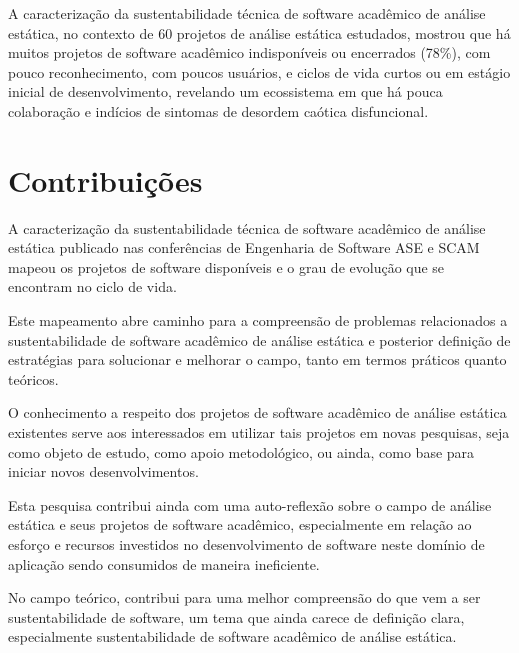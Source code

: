 A caracterização da sustentabilidade técnica de 
software acadêmico de análise estática, no contexto de 
60 projetos de análise estática estudados, mostrou que 
há muitos projetos de software acadêmico indisponíveis ou encerrados (78\%), 
com pouco reconhecimento, com poucos usuários, 
e ciclos de vida curtos ou em estágio inicial de desenvolvimento,
revelando um ecossistema em que há pouca colaboração
e indícios de sintomas de desordem caótica disfuncional.

\section{Contribuições}

A caracterização da sustentabilidade técnica de software acadêmico de análise estática
publicado nas conferências de Engenharia de Software ASE e SCAM 
mapeou os projetos de software disponíveis e o grau de evolução que
se encontram no ciclo de vida.

Este mapeamento abre caminho para a compreensão de problemas relacionados a 
sustentabilidade de software acadêmico de análise estática 
e posterior definição de estratégias para
solucionar e melhorar o campo, tanto em termos práticos quanto teóricos.

O conhecimento a respeito dos projetos de software acadêmico de análise estática
existentes serve aos interessados em utilizar tais projetos em novas pesquisas,
seja como objeto de estudo, como apoio metodológico, ou ainda, como base para
iniciar novos desenvolvimentos.


Esta pesquisa contribui ainda com uma auto-reflexão sobre o campo de análise
estática e seus projetos de software acadêmico, especialmente em relação ao
esforço e recursos investidos no desenvolvimento de software neste domínio de
aplicação sendo consumidos de maneira ineficiente.


No campo teórico, contribui para uma melhor compreensão do que vem a ser
sustentabilidade de software, um tema que ainda carece de definição clara,
especialmente sustentabilidade de software acadêmico de análise estática.

